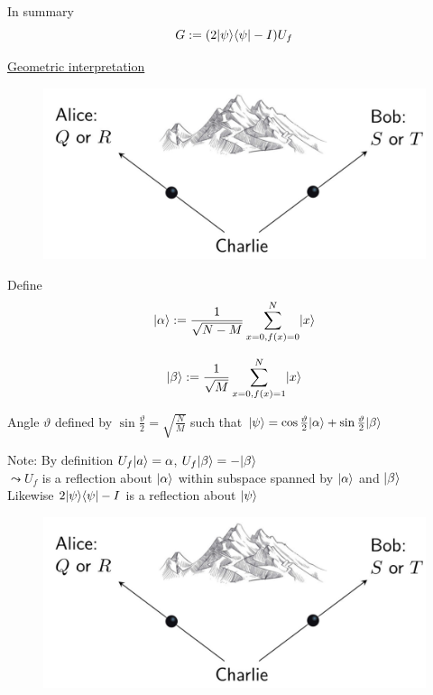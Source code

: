 In summary 
\begin{equation}
    G := (2 \lvert\psi\rangle \langle\psi\rvert - I) U_f
\end{equation}


\underline{Geometric interpretation}

\begin{figure}[H]
    \centering
    \includegraphics[scale=0.5]{chapters/res/alice-bob-charlie-mountain.png}
    \caption{}
\end{figure}


Define 
\begin{equation}
    \lvert\alpha\rangle := \frac{1}{\sqrt{N - M}} \sum_{x=0, f(x) = 0}^N \lvert x\rangle
\end{equation}

\begin{equation}
    \lvert\beta\rangle := \frac{1}{\sqrt{M}} \sum_{x=0, f(x) = 1}^N \lvert x\rangle
\end{equation}


Angle $\vartheta$ defined by $\sin \frac{\vartheta}{2} = \sqrt{\frac{N}{M}}$
such that $\lvert\psi\rangle = \cos \frac{\vartheta}{2} \lvert\alpha\rangle + \sin \frac{\vartheta}{2} \lvert\beta\rangle$

Note: By definition $U_f \lvert a\rangle = \alpha$, $U_f \lvert\beta\rangle = -\lvert\beta\rangle$ \\
$\leadsto U_f$ is a reflection about $\lvert\alpha\rangle$ within subspace spanned by $\lvert\alpha\rangle$ and $\lvert\beta\rangle$ \\

Likewise $2 \lvert\psi\rangle \langle\psi\rvert - I$ is a reflection about $\lvert\psi\rangle$

\begin{figure}[H]
    \centering
    \includegraphics[scale=0.5]{chapters/res/alice-bob-charlie-mountain.png}
    \caption{}
\end{figure}

